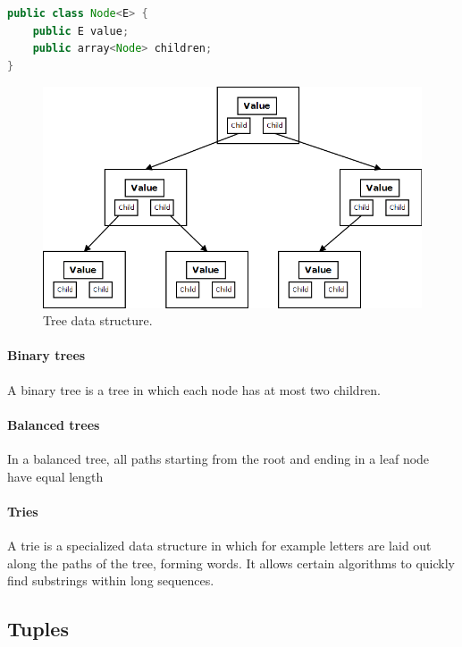 \begin{lstlisting}[language=java, caption=Node implementation for a standard tree., label=listing:node-doubly-linked-list]
public class Node<E> {
	public E value;
	public array<Node> children;
}
\end{lstlisting}

\begin{figure}[H]
	\begin{center}
		\includegraphics[width=0.7\columnwidth]{img/programming-fundamentals/tree}
		\caption{Tree data structure.}
		\label{fig:tree}
	\end{center}
\end{figure}


\paragraph{Binary trees}

A binary tree is a tree in which each node has at most two children.


\paragraph{Balanced trees}

In a balanced tree, all paths starting from the root and ending in a leaf node have equal length


\paragraph{Tries}

A trie is a specialized data structure in which for example letters are laid out along the paths of the tree, forming words. It allows certain algorithms to quickly find substrings within long sequences.


\subsection{Tuples}

